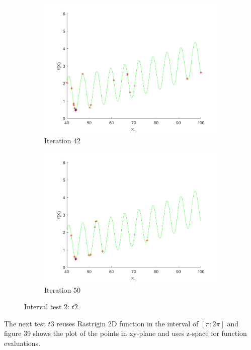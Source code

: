 \begin{figure}
\begin{subfigure}[b]{0.4\textwidth}
   \includegraphics[width=\textwidth]{img/smpl/grwnk1dshft/loa-iter-42}
   \caption{Iteration 42}
   \label{fig:s3-iter-6}
 \end{subfigure}
 \begin{subfigure}[b]{0.4\textwidth}
   \includegraphics[width=\textwidth]{img/smpl/grwnk1dshft/loa-iter-50}
   \caption{Iteration 50}
   \label{fig:s3-iter-7}
 \end{subfigure}
 \caption{Interval test 2: $t2$}
\end{figure}

\par The next test $t3$ reuses Rastrigin 2D function in the interval of $[\pi:2\pi]$ and figure 39 shows the plot of the points in xy-plane and uses z-space for function evaluations.

